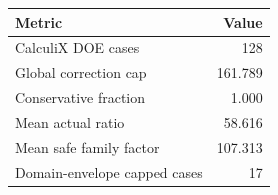 \begin{tabular}{lr}
\toprule
Metric & Value\\
\midrule
CalculiX DOE cases & 128\\
Global correction cap & 161.789\\
Conservative fraction & 1.000\\
Mean actual ratio & 58.616\\
Mean safe family factor & 107.313\\
Domain-envelope capped cases & 17\\
\bottomrule
\end{tabular}

